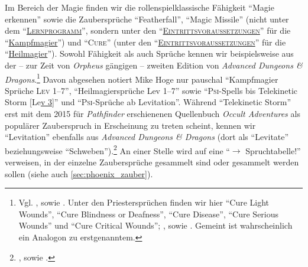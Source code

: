 \documentclass[a5paper,pagesize,numbers=noenddot]{scrbook}
\begin{document}
Im Bereich der Magie finden wir die rollenspielklassische Fähigkeit \enquote{Magie erkennen}\autocite[S.~2, 7]{orpheus_gildensystem} sowie die Zaubersprüche \enquote{Featherfall}\autocite[S.~9]{orpheus_gildensystem}, \enquote{Magic Missile} (nicht unter dem \enquote{\textsc{\uline{Lernprogramm}}}, sondern unter den \enquote{\textsc{\uline{Eintrittsvoraussetzun\-gen}}} für die \enquote{\uline{Kampfmagier}})\autocite[S.~2]{orpheus_gildensystem} und \enquote{\textsc{Cure}} (unter den \enquote{\textsc{\uline{Eintrittsvoraus\-setzungen}}} für die \enquote{\uline{Heilmagier}}).\autocite[S.~7]{orpheus_gildensystem}
Sowohl Fähigkeit als auch Sprüche kennen wir beispielsweise aus der -- zur Zeit von \textit{Orpheus} gängigen -- zweiten Edition von \textit{Advanced Dungeons \& Dragons}.\footnote{Vgl. \autocite[S.~133, 134, 136]{cook_adnd_1989}, sowie \autocite[S.~171, 173]{cook_adnd_1996}. Unter den Priestersprüchen finden wir hier \enquote{Cure Light Wounds}, \enquote{Cure Blindness or Deafness}, \enquote{Cure Disease}, \enquote{Cure Serious Wounds} und \enquote{Cure Critical Wounds}; \autocite[S.~199, 209\,f., 217, 222]{cook_adnd_1989}, sowie \autocite[S.~249, 261\,f., 264\,f., 272\,f., 278]{cook_adnd_1996}.
Gemeint ist wahrscheinlich ein Analogon zu erstgenanntem.} %
Davon abgesehen notiert Mike Hoge nur pauschal \enquote{Kampfmagier Sprüche \textsc{Lev} 1--7},\autocite[S.~2]{orpheus_gildensystem} \enquote{Heilmagiersprüche Lev 1--7}\autocite[S.~7]{orpheus_gildensystem} sowie \enquote{\textsc{Psi}-Spells bis Telekinetic Storm [Le\uline{v 3}]}\autocite[S.~10]{orpheus_gildensystem} und \enquote{\textsc{Psi}-Sprüche ab Levitation}.\autocite[S.~11]{orpheus_gildensystem}
Während \enquote{Telekinetic Storm} erst mit dem 2015 für \textit{Pathfinder} erschienenen Quellenbuch \textit{Occult Adventures} als populärer Zauberspruch in Erscheinung zu treten scheint,\autocite[Vgl.][S.~188]{bulmahn_pathfinder_2015} kennen wir \enquote{Levitation} ebenfalls aus \textit{Advanced Dungeons \& Dragons} (dort als \enquote{Levitate} beziehungsweise \enquote{Schweben}).\footnote{\autocite[Vgl.][S.~143]{cook_adnd_1989}, sowie \autocite[S.~186]{cook_adnd_1996}.} %
An einer Stelle wird auf eine \enquote{$\rightarrow$ Spruchtabelle!}\autocite[S.~10]{orpheus_gildensystem} verweisen, in der einzelne Zaubersprüche gesammelt sind oder gesammelt werden sollen (siehe auch \autoref{sec:phoenix_zauber}).
\end{document}
